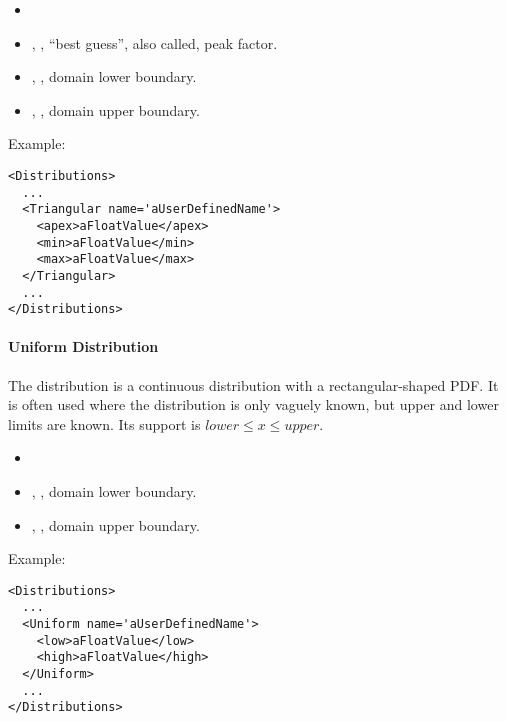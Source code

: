 %
\attrIntro
\vspace{-5mm}
\begin{itemize}
\itemsep0em
\item \nameDescription
\end{itemize}
\vspace{-5mm}
\subnodesIntro
\begin{itemize}
\item {}, , ``best guess'', also
  called, peak factor.
\item {}, , domain lower boundary.
\item {}, , domain upper boundary.
\end{itemize}

Example:
\begin{lstlisting}[style=XML]
<Distributions>
  ...
  <Triangular name='aUserDefinedName'>
    <apex>aFloatValue</apex>
    <min>aFloatValue</min>
    <max>aFloatValue</max>
  </Triangular>
  ...
</Distributions>
\end{lstlisting}

\paragraph{Uniform Distribution}
\label{Uniform}
The  distribution is a continuous distribution with a
rectangular-shaped PDF.
%
It is often used where the distribution is only vaguely known, but upper and
lower limits are known.
%
Its support is $lower \le x \le upper$.

%
\attrIntro
\vspace{-5mm}
\begin{itemize}
\itemsep0em
\item \nameDescription
\end{itemize}
\vspace{-5mm}
\subnodesIntro
\begin{itemize}
\item {}, , domain lower boundary.
\item {}, , domain upper
  boundary.
\end{itemize}

Example:
\begin{lstlisting}[style=XML]
<Distributions>
  ...
  <Uniform name='aUserDefinedName'>
    <low>aFloatValue</low>
    <high>aFloatValue</high>
  </Uniform>
  ...
</Distributions>
\end{lstlisting}

